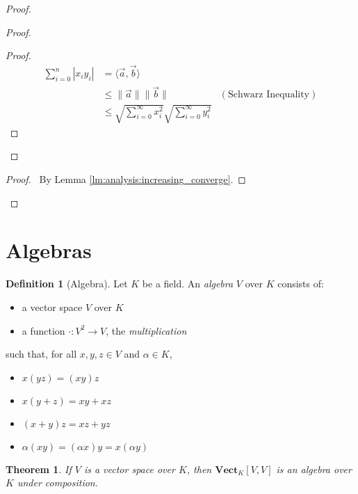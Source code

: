 \documentclass{book}
\newtheorem{thm}[lm]{Theorem}
\theoremstyle{definition}
\newtheorem{df}[lm]{Definition}
\begin{document}
\begin{proof}
\pf
{}
\begin{proof}
\begin{proof}
\pf
\begin{align*}
  \sum_{i=0}^n |x_i y_i| & = \langle \vec{a}, \vec{b} \rangle \\
  & \leq \| \vec{a} \| \| \vec{b} \| & (\text{Schwarz Inequality}) \\
  & \leq \sqrt{\sum_{i=0}^\infty x_i^2} \sqrt{\sum_{i=0}^\infty y_i^2}
\end{align*}
\end{proof}
\end{proof}
\qedstep
\begin{proof}
\pf\ By Lemma \ref{lm:analysis:increasing_converge}.
\end{proof}
\end{proof}

\section{Algebras}

\begin{df}[Algebra]
  Let $K$ be a field. An \emph{algebra} $V$ over $K$ consists of:
  \begin{itemize}
  \item a vector space $V$ over $K$
  \item a function $\cdot : V^2 \rightarrow V$, the \emph{multiplication}
  \end{itemize}
such that, for all $x,y,z \in V$ and $\alpha \in K$,
\begin{itemize}
\item $x(yz) = (xy)z$
\item $x(y+z) = xy+xz$
\item $(x+y)z = xz+yz$
\item $\alpha(xy) = (\alpha x)y = x (\alpha y)$
\end{itemize}
\end{df}

\begin{thm}
  If $V$ is a vector space over $K$, then $\mathbf{Vect}_K[V, V]$ is an algebra 
over $K$ under composition.
\end{thm}
\end{document}
